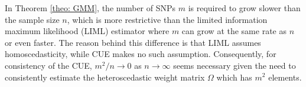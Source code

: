 \documentclass[12pt]{article}
\begin{document}





 






In Theorem \ref{theo: GMM}, the number of SNPs $ m $ is required to grow slower than the sample size $ n $, which is more restrictive than the limited information maximum likelihood (LIML) estimator \citep{Chao:2005aa} where $ m $ can grow at the same rate as $n$ or even faster. The reason behind this difference is that LIML assumes homoscedasticity, while CUE makes no such assumption. Consequently, for consistency of the CUE, $ m^2/n\rightarrow 0$ as $n\to\infty$ seems necessary given the need to consistently estimate  the heteroscedastic weight matrix $ \Omega $ which has $ m^2 $ elements.
\end{document}
